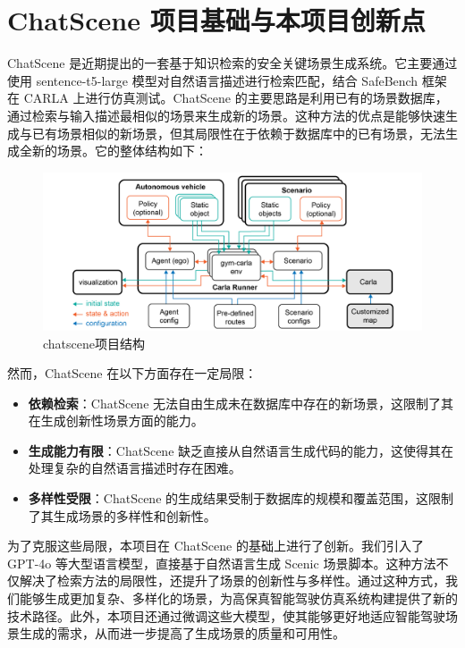 \section{ChatScene 项目基础与本项目创新点}
ChatScene 是近期提出的一套基于知识检索的安全关键场景生成系统。它主要通过使用 sentence-t5-large 模型对自然语言描述进行检索匹配，结合 SafeBench 框架在 CARLA 上进行仿真测试。ChatScene 的主要思路是利用已有的场景数据库，通过检索与输入描述最相似的场景来生成新的场景。这种方法的优点是能够快速生成与已有场景相似的新场景，但其局限性在于依赖于数据库中的已有场景，无法生成全新的场景。它的整体结构如下：
\begin{figure}[H]
	\centering
	\includegraphics[width=1.0\textwidth]{"images/chatscene项目结构.pdf"}
	\caption{chatscene项目结构}
	\label{fig:chatscene_framework}
\end{figure}
然而，ChatScene 在以下方面存在一定局限：
\begin{itemize}
	\item \textbf{依赖检索}：ChatScene 无法自由生成未在数据库中存在的新场景，这限制了其在生成创新性场景方面的能力。
	\item \textbf{生成能力有限}：ChatScene 缺乏直接从自然语言生成代码的能力，这使得其在处理复杂的自然语言描述时存在困难。
	\item \textbf{多样性受限}：ChatScene 的生成结果受制于数据库的规模和覆盖范围，这限制了其生成场景的多样性和创新性。
\end{itemize}

为了克服这些局限，本项目在 ChatScene 的基础上进行了创新。我们引入了 GPT-4o 等大型语言模型，直接基于自然语言生成 Scenic 场景脚本。这种方法不仅解决了检索方法的局限性，还提升了场景的创新性与多样性。通过这种方式，我们能够生成更加复杂、多样化的场景，为高保真智能驾驶仿真系统构建提供了新的技术路径。此外，本项目还通过微调这些大模型，使其能够更好地适应智能驾驶场景生成的需求，从而进一步提高了生成场景的质量和可用性。